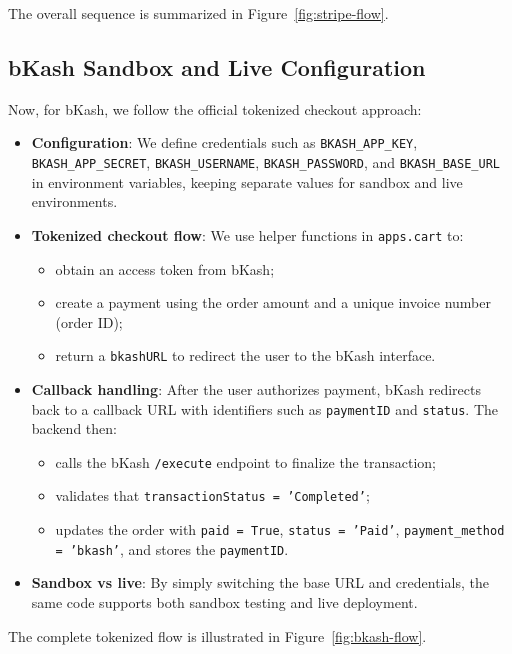 The overall sequence is summarized in Figure~\ref{fig:stripe-flow}.

\subsection{bKash Sandbox and Live Configuration}

Now, for bKash, we follow the official tokenized checkout approach:

\begin{itemize}
  \item \textbf{Configuration}: We define credentials such as \texttt{BKASH\_APP\_KEY}, \texttt{BKASH\_APP\_SECRET}, \texttt{BKASH\_USERNAME}, \texttt{BKASH\_PASSWORD}, and \texttt{BKASH\_BASE\_URL} in environment variables, keeping separate values for sandbox and live environments.
  \item \textbf{Tokenized checkout flow}: We use helper functions in \texttt{apps.cart} to:
  \begin{itemize}
    \item obtain an access token from bKash;
    \item create a payment using the order amount and a unique invoice number (order ID);
    \item return a \texttt{bkashURL} to redirect the user to the bKash interface.
  \end{itemize}
  \item \textbf{Callback handling}: After the user authorizes payment, bKash redirects back to a callback URL with identifiers such as \texttt{paymentID} and \texttt{status}. The backend then:
  \begin{itemize}
    \item calls the bKash \texttt{/execute} endpoint to finalize the transaction;
    \item validates that \texttt{transactionStatus = 'Completed'};
    \item updates the order with \texttt{paid = True}, \texttt{status = 'Paid'}, \texttt{payment\_method = 'bkash'}, and stores the \texttt{paymentID}.
  \end{itemize}
  \item \textbf{Sandbox vs live}: By simply switching the base URL and credentials, the same code supports both sandbox testing and live deployment.
\end{itemize}

The complete tokenized flow is illustrated in Figure~\ref{fig:bkash-flow}.

